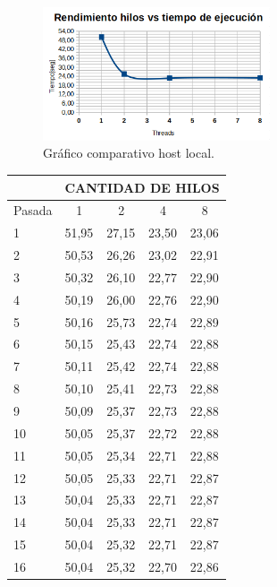 \documentclass[a4paper]{article}
\begin{document}
\begin{figure}[H]
	\begin{center}		
	\includegraphics[width=0.6\textwidth]{002.png}
  	\caption{Gráfico comparativo host local.}
  	\label{fig:grafnote}
  	\end{center}
\end{figure}

\begin{table}[]
\centering
\begin{tabular}{lllll}
         & \multicolumn{4}{c}{\textbf{CANTIDAD DE HILOS}}                                                \\ \hline
Pasada   & \multicolumn{1}{c}{1} & \multicolumn{1}{c}{2} & \multicolumn{1}{c}{4} & \multicolumn{1}{c}{8} \\
1       & 51,95 & 27,15 & 23,50 & 23,06 \\
2       & 50,53 & 26,26 & 23,02 & 22,91 \\
3       & 50,32 & 26,10 & 22,77 & 22,90 \\
4       & 50,19 & 26,00 & 22,76 & 22,90 \\
5       & 50,16 & 25,73 & 22,74 & 22,89 \\
6       & 50,15 & 25,43 & 22,74 & 22,88 \\
7       & 50,11 & 25,42 & 22,74 & 22,88 \\
8       & 50,10 & 25,41 & 22,73 & 22,88 \\
9       & 50,09 & 25,37 & 22,73 & 22,88 \\
10      & 50,05 & 25,37 & 22,72 & 22,88 \\
11      & 50,05 & 25,34 & 22,71 & 22,88 \\
12      & 50,05 & 25,33 & 22,71 & 22,87 \\
13      & 50,04 & 25,33 & 22,71 & 22,87 \\
14      & 50,04 & 25,33 & 22,71 & 22,87 \\
15      & 50,04 & 25,32 & 22,71 & 22,87 \\
16      & 50,04 & 25,32 & 22,70 & 22,86 \\

\end{tabular}
\end{table}
\end{document}
